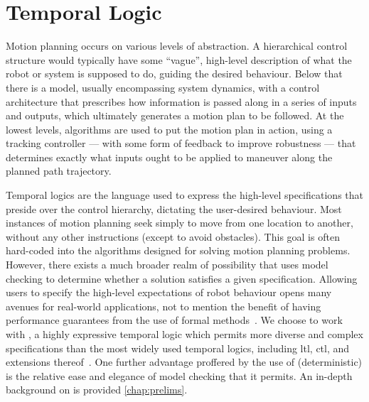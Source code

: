 \section{Temporal Logic}


Motion planning occurs on various levels of abstraction. A hierarchical control structure would typically have some ``vague'', high-level description of what the robot or system is supposed to do, guiding the desired behaviour. Below that there is a model, usually encompassing system dynamics, with a control architecture that prescribes how information is passed along in a series of inputs and outputs, which ultimately generates a motion plan to be followed. At the lowest levels, algorithms are used to put the motion plan in action, using a tracking controller --- with some form of feedback to improve robustness --- that determines exactly what inputs ought to be applied to maneuver along the planned path trajectory.

Temporal logics are the language used to express the high-level specifications that preside over the control hierarchy, dictating the user-desired behaviour. Most instances of motion planning seek simply to move from one location to another, without any other instructions (except to avoid obstacles). This goal is often hard-coded into the algorithms designed for solving motion planning problems. However, there exists a much broader realm of possibility that uses model checking to determine whether a solution satisfies a given specification. Allowing users to specify the high-level expectations of robot behaviour opens many avenues for real-world applications, not to mention the benefit of having performance guarantees from the use of formal methods~\cite{Lin2014}. We choose to work with \mucalc{}, a highly expressive temporal logic which permits more diverse and complex specifications than the most widely used temporal logics, including \gls{ltl}, \gls{ctl}, and extensions thereof~\cite{Karaman2009}. One further advantage proffered by the use of (deterministic) \mucalc{} is the relative ease and elegance of model checking that it permits. An in-depth background on \mucalc{} is provided \autoref{chap:prelims}.



